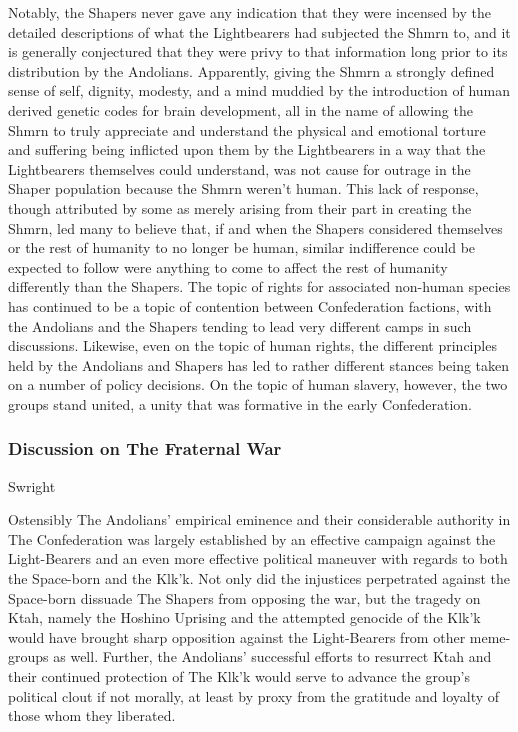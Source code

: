 Notably, the Shapers never gave any indication that they were incensed
by the detailed descriptions of what the Lightbearers had subjected
the Shmrn to, and it is generally conjectured that they were privy to
that information long prior to its distribution by the
Andolians. Apparently, giving the Shmrn a strongly defined sense of
self, dignity, modesty, and a mind muddied by the introduction of
human derived genetic codes for brain development, all in the name of
allowing the Shmrn to truly appreciate and understand the physical and
emotional torture and suffering being inflicted upon them by the
Lightbearers in a way that the Lightbearers themselves could
understand, was not cause for outrage in the Shaper population because
the Shmrn weren't human. This lack of response, though attributed by
some as merely arising from their part in creating the Shmrn, led many
to believe that, if and when the Shapers considered themselves or the
rest of humanity to no longer be human, similar indifference could be
expected to follow were anything to come to affect the rest of
humanity differently than the Shapers. The topic of rights for
associated non-human species has continued to be a topic of contention
between Confederation factions, with the Andolians and the Shapers
tending to lead very different camps in such discussions. Likewise,
even on the topic of human rights, the different principles held by
the Andolians and Shapers has led to rather different stances being
taken on a number of policy decisions. On the topic of human slavery,
however, the two groups stand united, a unity that was formative in
the early Confederation.


\subsubsection{Discussion on The Fraternal War}
Swright

Ostensibly The Andolians' empirical eminence and their considerable
authority in The Confederation was largely established by an effective
campaign against the Light-Bearers and an even more effective
political maneuver with regards to both the Space-born and the
Klk'k. Not only did the injustices perpetrated against the Space-born
dissuade The Shapers from opposing the war, but the tragedy on Ktah,
namely the Hoshino Uprising and the attempted genocide of the Klk'k
would have brought sharp opposition against the Light-Bearers from
other meme-groups as well. Further, the Andolians' successful efforts
to resurrect Ktah and their continued protection of The Klk'k would
serve to advance the group's political clout if not morally, at least
by proxy from the gratitude and loyalty of those whom they liberated.

